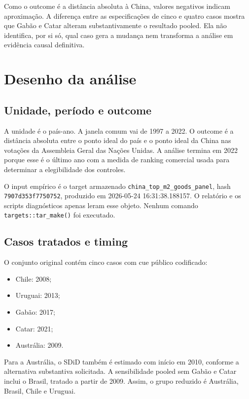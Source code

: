 \documentclass[
  brazilian,
  11pt,
]{article}
\providecommand{\tightlist}{%
  \setlength{\itemsep}{0pt}\setlength{\parskip}{0pt}}
\begin{document}
Como o outcome é a distância absoluta à China, valores negativos indicam
aproximação. A diferença entre as especificações de cinco e quatro casos
mostra que Gabão e Catar alteram substantivamente o resultado pooled.
Ela não identifica, por si só, qual caso gera a mudança nem transforma a
análise em evidência causal definitiva.

\section{Desenho da análise}\label{desenho-da-anuxe1lise}

\subsection{Unidade, período e
outcome}\label{unidade-peruxedodo-e-outcome}

A unidade é o país-ano. A janela comum vai de 1997 a 2022. O outcome é a
distância absoluta entre o ponto ideal do país e o ponto ideal da China
nas votações da Assembleia Geral das Nações Unidas. A análise termina em
2022 porque esse é o último ano com a medida de ranking comercial usada
para determinar a elegibilidade dos controles.

O input empírico é o target armazenado
\texttt{china\_top\_m2\_goods\_panel}, hash \texttt{7907d353f7750752},
produzido em 2026-05-24 16:31:38.188157. O relatório e os scripts
diagnósticos apenas leram esse objeto. Nenhum comando
\texttt{targets::tar\_make()} foi executado.

\subsection{Casos tratados e timing}\label{casos-tratados-e-timing}

O conjunto original contém cinco casos com cue público codificado:

\begin{itemize}
\tightlist
\item
  Chile: 2008;
\item
  Uruguai: 2013;
\item
  Gabão: 2017;
\item
  Catar: 2021;
\item
  Austrália: 2009.
\end{itemize}

Para a Austrália, o SDiD também é estimado com início em 2010, conforme
a alternativa substantiva solicitada. A sensibilidade pooled sem Gabão e
Catar inclui o Brasil, tratado a partir de 2009. Assim, o grupo reduzido
é Austrália, Brasil, Chile e Uruguai.
\end{document}
